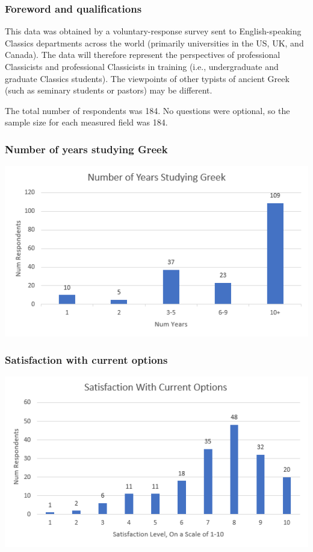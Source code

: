 \documentclass[11pt]{article}
\begin{document}
\subsubsection{Foreword and qualifications}
\label{sec:orga4dd7e3}

This data was obtained by a voluntary-response survey sent to English-speaking Classics departments across the world (primarily universities in the US, UK, and Canada). The data will therefore represent the perspectives of professional Classicists and professional Classicists in training (i.e., undergraduate and graduate Classics students). The viewpoints of other typists of ancient Greek (such as seminary students or pastors) may be different.

The total number of respondents was 184. No questions were optional, so the sample size for each measured field was 184.

\subsubsection{Number of years studying Greek}
\label{sec:org6a4f667}

\begin{center}
\includegraphics[width=.9\linewidth]{./images/years-studied.PNG}
\end{center}

\subsubsection{Satisfaction with current options}
\label{sec:org6bb7aa8}

\begin{center}
\includegraphics[width=.9\linewidth]{./images/satisfaction.PNG}
\end{center}
\end{document}
